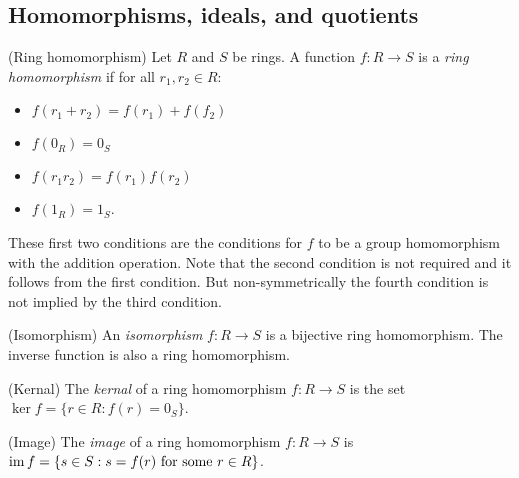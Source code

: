 \documentclass{article}
\begin{document}
\begin{itemize}
\subsection{Homomorphisms, ideals, and quotients}
\begin{definition}
	(Ring homomorphism) Let $ R $ and $ S $ be rings. A function $ f:R\to S $ is a \textit{ring homomorphism} if for all $ r_1,r_2\in R $:
	\begin{itemize}
		\item $ f(r_1+r_2)=f(r_1)+f(f_2) $
		\item $ f(0_R)=0_S $
		\item $ f(r_1r_2)=f(r_1)f(r_2) $
		\item $ f(1_R)=1_S $.
	\end{itemize}
\end{definition}
These first two conditions are the conditions for $ f $ to be a group homomorphism with the addition operation. Note that the second condition is not required and it follows from the first condition. But non-symmetrically the fourth condition is not implied by the third condition.
\begin{definition}
	(Isomorphism) An \textit{isomorphism} $ f:R\to S $ is a bijective ring homomorphism. The inverse function is also a ring homomorphism.
\end{definition}
\begin{definition}
	(Kernal) The \textit{kernal} of a ring homomorphism $ f: R\to S $ is the set $ \ker f = \{r\in R: f(r)=0_S\} $.
\end{definition}
\begin{definition}
	(Image) The \textit{image} of a ring homomorphism $ f: R\to S $ is $ \operatorname{im} f = \{s\in S:s=f(r) \text{ for some } r\in R \}$.
\end{definition}


\end{itemize}
\end{document}
